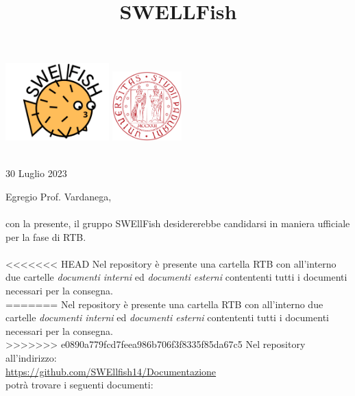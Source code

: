 \documentclass[12pt]{article}
\begin{document}
\graphicspath{ {../templates/img/} }
\title{SWELLFish}

\begin{center}
    \includegraphics[width=0.3\textwidth]{../templates/img/Swellfish_logo.png}
    \hspace{3cm}
    \includegraphics[width=0.2\textwidth]{../templates/img/logoUnipd.png}\\
    \end{center}
    \begin{flushright}
        \
        \textbf{}\\
        30 Luglio 2023
    \end{flushright}  

Egregio Prof. Vardanega,\\\\
con la presente, il gruppo SWEllFish desidererebbe candidarsi in maniera ufficiale
per la fase di RTB.\\\\
<<<<<<< HEAD
Nel repository è presente una cartella RTB con all'interno due cartelle \textit{documenti interni} ed \textit{documenti esterni} contententi tutti i documenti necessari per la consegna.\\
=======
Nel repository è presente una cartella RTB con all’interno due cartelle \textit{documenti interni} ed \textit{documenti esterni} contententi tutti i documenti necessari
per la consegna.\\
>>>>>>> e0890a779fcd7feea986b706f3f8335f85da67c5
Nel repository all'indirizzo: \\
\href{https://github.com/SWEllfish14/Documentazione}{\underline{https://github.com/SWEllfish14/Documentazione}}\\ 
potrà trovare i seguenti documenti:\\\\
\end{document}
